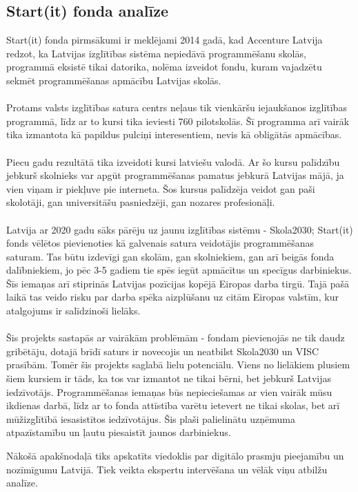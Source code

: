 \subsection{Start(it) fonda analīze}
Start(it) fonda pirmsākumi ir meklējami 2014 gadā, kad Accenture Latvija redzot, ka Latvijas izglītības
sistēma nepiedāvā programmēšanu skolās, programmā eksistē tikai datorika, nolēma izveidot fondu, kuram
vajadzētu sekmēt programmēšanas apmācību Latvijas skolās.
\paragraph{}
Protams valsts izglītības satura centrs neļaus tik vienkāršu iejaukšanos izglītības programmā, līdz ar
to kursi tika ieviesti 760 pilotskolās. Šī programma arī vairāk tika izmantota kā papildus pulciņi 
interesentiem, nevis kā obligātās apmācības.
\paragraph{}
Piecu gadu rezultātā tika izveidoti kursi latviešu valodā. Ar šo kursu palīdzību jebkurš skolnieks 
var apgūt programmēšanas pamatus jebkurā Latvijas mājā, ja vien viņam ir piekļuve pie interneta. Šos kursus palīdzēja
veidot gan paši skolotāji, gan universitāšu pasniedzēji, gan nozares profesionāļi.
\paragraph{}
Latvija ar 2020 gadu sāks pārēju uz jaunu izglītības sistēmu - Skola2030; Start(it) fonds vēlētos pievienoties
kā galvenais satura veidotājis programmēšanas saturam. Tas būtu izdevīgi gan skolām, gan skolniekiem,
gan arī beigās fonda dalībniekiem, jo pēc 3-5 gadiem tie spēs iegūt apmācītus un specīgus darbiniekus.
Šīs iemaņas arī stiprinās Latvijas pozīcijas kopējā Eiropas darba tirgū. Tajā pašā laikā tas veido risku
par darba spēka aizplūšanu uz citām Eiropas valstīm, kur atalgojums ir salīdzinoši lielāks.
\paragraph{}
Šis projekts sastapās ar vairākām problēmām - fondam pievienojās ne tik daudz gribētāju, dotajā brīdī
saturs ir novecojis un neatbilst Skola2030 un VISC prasībām. Tomēr šis projekts saglabā lielu potenciālu.
Viens no lielākiem plusiem šiem kursiem ir tāds, ka tos var izmantot ne tikai bērni, bet jebkurš Latvijas
iedzīvotājs. Programmēšanas iemaņas būs nepieciešamas ar vien vairāk mūsu ikdienas darbā, līdz ar to fonda
attīstība varētu ietevert ne tikai skolas, bet arī mūžizglītībā iesasistītos iedzīvotājus. Šis plaši palielinātu
uzņēmuma atpazīstamību un ļautu piesaistīt jaunos darbiniekus.
\par
Nākošā apakšnodaļā tiks apskatīts viedoklis par digitālo prasmju pieejamību un nozīmīgumu Latvijā. Tiek veikta
ekspertu intervēšana un vēlāk viņu atbilžu analīze.
